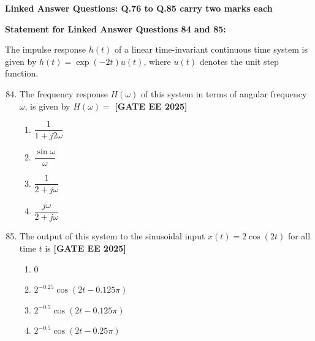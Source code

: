 \documentclass[12pt,a4paper]{article}
\begin{document}
\vspace{1em}
\item \textbf{Linked Answer Questions: Q.76 to Q.85 carry two marks each}
\item \textbf{Statement for Linked Answer Questions 84 and 85: }
\vspace{1em}
\newline
\item The impulse response $h(t)$ of a linear time-invariant continuous time system is given by
$h(t) = \exp(-2 t) u(t)$, where $u(t)$ denotes the unit step function.

\begin{enumerate}[leftmargin=*, label=\textbf{Q.\arabic*:}]
\setcounter{enumi}{83}

\item The frequency response $H(\omega)$ of this system in terms of angular frequency $\omega$, is given by $H(\omega) = $
\newline
\noindent \textbf{[GATE EE 2025]}
\begin{enumerate}[label=(\Alph*)]
  \item $\dfrac{1}{1 + j2\omega}$
  \item $\dfrac{\sin \omega}{\omega}$
  \item $\dfrac{1}{2 + j\omega}$
  \item $\dfrac{j\omega}{2 + j\omega}$
\end{enumerate}

\item The output of this system to the sinusoidal input $x(t) = 2 \cos (2t)$ for all time $t$ is
\newline
\noindent \textbf{[GATE EE 2025]}
\begin{enumerate}[label=(\Alph*)]
  \item $0$
  \item $2^{-0.25} \cos (2t - 0.125\pi)$
  \item $2^{-0.5} \cos (2t - 0.125\pi)$
  \item $2^{-0.5} \cos (2t - 0.25\pi)$
\end{enumerate}

\end{enumerate}
\end{document}
